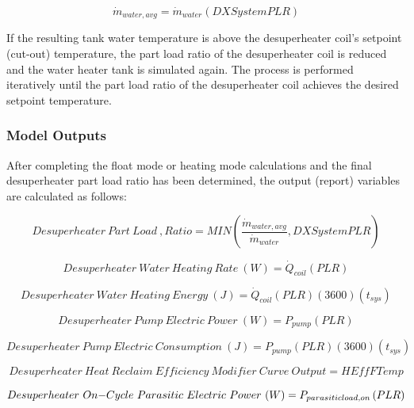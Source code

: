 \begin{equation}
\dot{m}_{water,avg} = \dot{m}_{water} \left( {DXSystemPLR} \right)
\end{equation}

If the resulting tank water temperature is above the desuperheater coil's setpoint (cut-out) temperature, the part load ratio of the desuperheater coil is reduced and the water heater tank is simulated again. The process is performed iteratively until the part load ratio of the desuperheater coil achieves the desired setpoint temperature.

\subsubsection{Model Outputs}\label{model-outputs}

After completing the float mode or heating mode calculations and the final desuperheater part load ratio has been determined, the output (report) variables are calculated as follows:

\begin{equation}
Desuperheater~Part~Load~,Ratio = MIN\left( {\frac{{\dot{m}_{water,avg}}}{{\dot{m}_{water}}},DXSystemPLR} \right)
\end{equation}

\begin{equation}
Desuperheater~Water~Heating~Rate~(W) = {\dot Q_{coil}}\left( {PLR} \right)
\end{equation}

\begin{equation}
Desuperheater~Water~Heating~Energy~(J) = {\dot Q_{coil}}\left( {PLR} \right)(3600)\left( {{t_{sys}}} \right)
\end{equation}

\begin{equation}
Desuperheater~Pump~Electric~Power~(W) = {P_{pump}}\left( {PLR} \right)
\end{equation}

\begin{equation}
Desuperheater~Pump~Electric~Consumption~(J) = {P_{pump}}\left( {PLR} \right)\left( {3600} \right)\left( {{t_{sys}}} \right)
\end{equation}

\begin{equation}
Desuperheater~Heat~Reclaim~Efficiency~Modifier~Curve~Output = HEffFTemp
\end{equation}

\begin{equation}
Desuperheater~On{\rm{ - }}Cycle~Parasitic~Electric~Power~(W) = {P_{parasiticload,on}}\left( {PLR} \right)
\end{equation}

